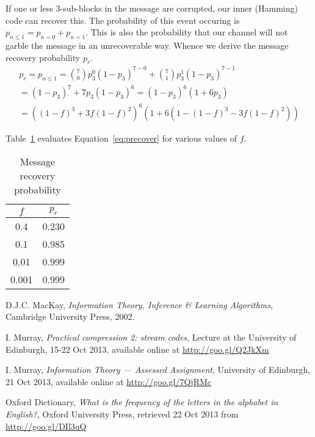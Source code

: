 \documentclass[10pt,a4paper,oneside,onecolumn]{article}
\begin{document}
If one or less 3-sub-blocks in the message are corrupted, our inner (Hamming)
code can recover this. The probability of this event occuring is $p_{n \leq 1} =
p_{n=0} + p_{n=1}$. This is also the probability that our channel will not
garble the message in an unrecoverable way. Whence we derive the message
recovery probability $p_r$.
\begin{equation}\label{eq:precover}
\begin{split}
p_r = p_{n \leq 1} =
{7 \choose 0} p_3^0(1-p_3)^{7-0} + {7 \choose 1} p_3^1(1-p_3)^{7-1} \\
= (1-p_3)^7 + 7p_3(1-p_3)^6 = (1-p_3)^6(1+6p_3) \\
= ((1-f)^3+3f(1-f)^2)^6(1+6(1 - (1-f)^3 - 3f(1-f)^2))
\end{split}
\end{equation}

Table~\ref{tbl:precover} evaluates Equation~\eqref{eq:precover} for various
values of $f$.

\begin{table}[ht]
\centering
\begin{tabular}{| c | c |}
\hline
$f$ & $p_r$ \\
\hline
0.4   & 0.230 \\
0.1   & 0.985 \\
0.01  & 0.999 \\
0.001 & 0.999 \\
\hline
\end{tabular}
\caption{Message recovery probability}
\label{tbl:precover}
\end{table}


\begin{thebibliography}{9}

    D.J.C. MacKay,
    \emph{Information Theory, Inference \& Learning Algorithms},
    Cambridge University Press,
    2002.

    I. Murray,
    \emph{Practical compression 2: stream codes},
    Lecture at the University of Edinburgh,
    15-22 Oct 2013,
    available online at \url{http://goo.gl/Q2JkXm}

    I. Murray,
    \emph{Information Theory — Assessed Assignment},
    University of Edinburgh,
    21 Oct 2013,
    available online at \url{http://goo.gl/7QjRMc}

    Oxford Dictionary,
    \emph{What is the frequency of the letters in the alphabet in English?},
    Oxford University Press,
    retrieved 22 Oct 2013 from \url{http://goo.gl/DIl3uQ}

\end{thebibliography}
\end{document}
